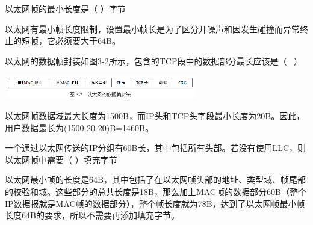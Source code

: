 \question 以太网帧的最小长度是（ ）字节
\par{}
\begin{solution}以太网有最小帧长度限制，设置最小帧长是为了区分开噪声和因发生碰撞而异常终止的短帧，它必须要大于64B。
\end{solution}
\question 以太网的数据帧封装如图3-2所示，包含的TCP段中的数据部分最长应该是（ ~）

\includegraphics[width=3.33333in,height=0.40625in]{computerassets/25d66fd7ecf9a4aa73d66c4295ed68fb.png}
\par{}
\begin{solution}以太网帧数据域最大长度为1500B，而IP头和TCP头字段最小长度为20B。因此，用户数据最长为(1500-20-20)B=1460B。
\end{solution}
\question 一个通过以太网传送的IP分组有60B长，其中包括所有头部。若没有使用LLC，则以太网帧中需要（
）填充字节
\par{}
\begin{solution}以太网最小帧的长度是64B，其中包括了在以太网帧头部的地址、类型域、帧尾部的校验和域。这些部分的总共长度是18B，那么加上MAC帧的数据部分60B（整个IP数据报就是MAC帧的数据部分），整个帧长度就为78B，达到了以太网帧最小帧长度64B的要求，所以不需要再添加填充字节。
\end{solution}

